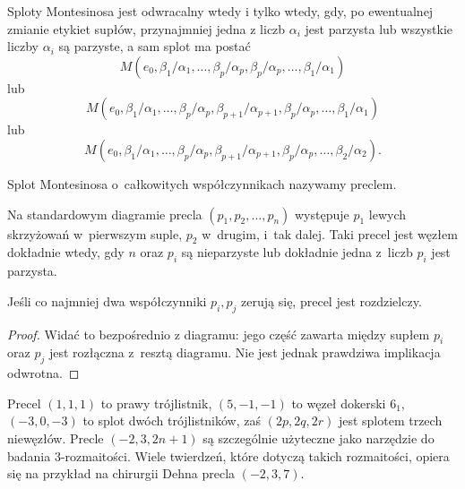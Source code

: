 \begin{proposition}
    Sploty Montesinosa jest odwracalny wtedy i tylko wtedy, gdy, po ewentualnej zmianie etykiet supłów, przynajmniej jedna z liczb $\alpha_i$ jest parzysta lub wszystkie liczby $\alpha_i$ są parzyste, a sam splot ma postać
    \begin{equation}
        M(e_0, \beta_1/\alpha_1, \ldots, \beta_p/\alpha_p, \beta_p/\alpha_p, \ldots, \beta_1/\alpha_1)
    \end{equation}
    lub
    \begin{equation}
        M(e_0, \beta_1/\alpha_1, \ldots, \beta_p/\alpha_p, \beta_{p+1}/\alpha_{p+1}, \beta_p/\alpha_p, \ldots, \beta_1/\alpha_1)
    \end{equation}
    lub
    \begin{equation}
         M(e_0, \beta_1/\alpha_1, \ldots, \beta_p/\alpha_p, \beta_{p+1}/\alpha_{p+1}, \beta_p/\alpha_p, \ldots, \beta_2/\alpha_2).
    \end{equation}
\end{proposition}

\begin{definition}[precel]
    \label{def:pretzel}
    Splot Montesinosa o~całkowitych współczynnikach nazywamy preclem.
\end{definition}

Na standardowym diagramie precla $(p_1, p_2, \ldots, p_n)$ występuje $p_1$ lewych skrzyżowań w~pierwszym suple, $p_2$ w~drugim, i~tak dalej.
Taki precel jest węzłem dokładnie wtedy, gdy $n$ oraz $p_i$ są nieparzyste lub dokładnie jedna z~liczb $p_i$ jest parzysta.

\begin{proposition}
    Jeśli co najmniej dwa współczynniki $p_i, p_j$ zerują się, precel jest rozdzielczy.
\end{proposition}

\begin{proof}
    Widać to bezpośrednio z diagramu: jego część zawarta między supłem $p_i$ oraz $p_j$ jest rozłączna z~resztą diagramu.
    Nie jest jednak prawdziwa implikacja odwrotna.
\end{proof}

Precel $(1,1,1)$ to prawy trójlistnik, $(5, -1, -1)$ to węzeł dokerski $6_1$, $(-3, 0, -3)$ to splot dwóch trójlistników, zaś $(2p, 2q, 2r)$ jest splotem trzech niewęzłów.
Precle $(-2, 3, 2n+1)$ są szczególnie użyteczne jako narzędzie do badania 3-rozmaitości.
Wiele twierdzeń, które dotyczą takich rozmaitości, opiera się na przykład na chirurgii Dehna precla $(-2, 3, 7)$.

